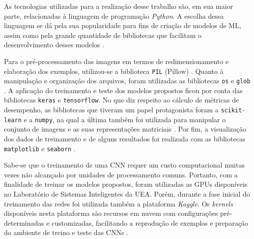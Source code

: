 
As tecnologias utilizadas para a realização desse trabalho são, em sua maior parte, relacionadas à linguagem de programação \emph{Python}. A escolha dessa linguagem se dá pela sua popularidade para fins de criação de modelos de ML, assim como pela grande quantidade de bibliotecas que facilitam o desenvolvimento desses modelos \cite{brink}.

Para o pré-processamento das imagens em termos de redimensionamento e elaboração dos exemplos, utilizou-se a biblioteca \texttt{PIL} (Pillow) \cite{pillow}. Quanto à manipulação e organização dos arquivos, foram utilizadas as bibliotecas \texttt{os} e \texttt{glob} \cite{os,glob}. A aplicação do treinamento e teste dos modelos propostos ficou por conta das bibliotecas \texttt{keras} e \texttt{tensorflow}\cite{keras, tensorflow}. No que diz respeito ao cálculo de métricas de desempenho, as bibliotecas que tiveram um papel protagonista foram a \texttt{scikit-learn} e a \texttt{numpy}, na qual a última também foi utilizada para manipular o conjunto de imagens e as suas representações matriciais \cite{sklearn,numpy}. Por fim, a visualização dos dados de treinamento e de alguns resultados foi realizada com as bibliotecas \texttt{matplotlib} e \texttt{seaborn} \cite{matplotlib, seaborn}.

Sabe-se que o treinamento de uma CNN requer um custo computacional muitas vezes não alcançado por unidades de processamento comuns. Portanto, com a finalidade de treinar os modelos propostos, foram utilizadas as GPUs disponíveis no Laboratório de Sistemas Inteligentes da UEA. Porém, durante a fase inicial do treinamento das redes foi utilizada também a plataforma \emph{Kaggle}. Os \emph{kernels} disponíveis nesta plataforma são recursos em nuvem com configurações pré-determinadas e customizadas, facilitando a reprodução de exemplos e preparação do ambiente de treino e teste das CNNs \cite{kaggle}.
